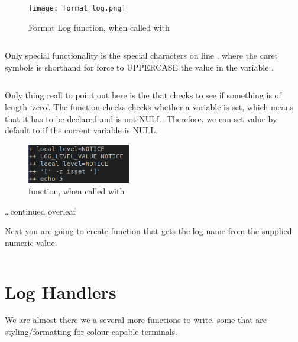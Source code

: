 \documentclass{article}
\begin{document}
\begin{figure}[H]
    \centering
    \texttt{[image: format\_log.png]}
    \caption{Format Log function, when called with }
\end{figure}


\inputminted[frame=single,firstline=89,lastline=97,linenos]{bash}{rfclogger.sh}

Only special functionality is the special characters on line ,  where the caret symbols \code{\textasciicircum\textasciicircum} is shorthand for force to UPPERCASE the value in the variable .

\inputminted[frame=single,firstline=99,lastline=105,linenos]{bash}{rfclogger.sh}

Only thing reall to point out here is the that  checks to see if something is of length `zero'. The function  checks checks whether a variable is set, which means that it has to be declared and is not NULL. Therefore, we can set value by default to  if the current  variable is NULL. 

\begin{figure}[H]
    \centering
    \includegraphics[width=0.4\textwidth]{images/log_level_val.PNG}
    \caption{ function, when called with }
\end{figure}

\begin{center}
    \vspace{6em}\ldots continued overleaf
\end{center}
\newpage
Next you are going to create function that gets the log name from the supplied numeric value.

\inputminted[frame=single,firstline=107,lastline=116,linenos]{bash}{rfclogger.sh}

\section*{Log Handlers}
\label{subsec:log_han}
We are almost there we a several more functions to write, some that are styling/formatting for colour capable terminals. 
\end{document}
